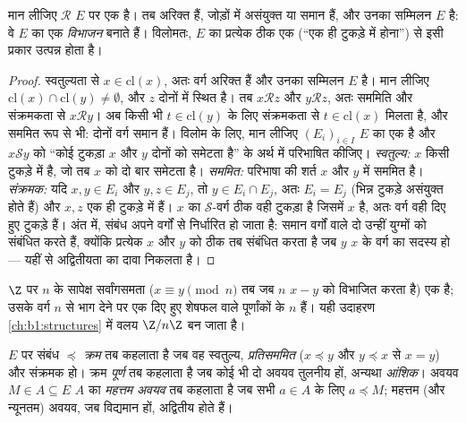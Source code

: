 \begin{theorem}[वर्ग विभाजन बनाते हैं]\label{thm:b1:logic:partition}
मान लीजिए $\mathcal{R}$ $E$ पर एक  है। तब  अरिक्त
हैं, जोड़ों में असंयुक्त या समान हैं, और उनका सम्मिलन $E$ है: वे $E$ का एक
\emph{विभाजन} बनाते हैं। विलोमतः, $E$ का प्रत्येक  ठीक
एक  (``एक ही टुकड़े में होना'') से इसी प्रकार उत्पन्न होता है।
\end{theorem}

\begin{proof}
स्वतुल्यता से $x \in \mathrm{cl}(x)$, अतः वर्ग अरिक्त हैं और उनका सम्मिलन
$E$ है। मान लीजिए $\mathrm{cl}(x) \cap \mathrm{cl}(y) \neq \emptyset$, और
$z$ दोनों में स्थित है। तब $x \mathbin{\mathcal{R}} z$ और $y
\mathbin{\mathcal{R}} z$, अतः सममिति और संक्रमकता से $x
\mathbin{\mathcal{R}} y$। अब किसी भी $t \in \mathrm{cl}(y)$ के लिए संक्रमकता
से $t \in \mathrm{cl}(x)$ मिलता है, और सममित रूप से भी: दोनों वर्ग समान हैं।
विलोम के लिए, मान लीजिए $(E_i)_{i \in I}$ $E$ का एक  है और $x
\mathbin{\mathcal S} y$ को ``कोई टुकड़ा $x$ और $y$ दोनों को समेटता है'' के
अर्थ में परिभाषित कीजिए। \emph{स्वतुल्य:} $x$ किसी टुकड़े में है, जो तब $x$
को दो बार समेटता है। \emph{सममित:} परिभाषा की शर्त $x$ और $y$ में सममित है।
\emph{संक्रमक:} यदि $x, y \in E_i$ और $y, z \in E_j$, तो $y \in E_i \cap
E_j$, अतः $E_i = E_j$ (भिन्न टुकड़े असंयुक्त होते हैं) और $x, z$ एक ही
टुकड़े में हैं। $x$ का $\mathcal S$-वर्ग ठीक वही टुकड़ा है जिसमें $x$ है,
अतः वर्ग वही दिए हुए टुकड़े हैं। अंत में, संबंध अपने वर्गों से निर्धारित हो
जाता है: समान वर्गों वाले दो  उन्हीं युग्मों को संबंधित करते
हैं, क्योंकि प्रत्येक $x$ और $y$ को ठीक तब संबंधित करता है जब $y$ $x$ के
वर्ग का सदस्य हो --- यहीं से अद्वितीयता का दावा निकलता है।
\end{proof}

\begin{example}\label{ex:b1:logic:congruence}
$\Z$ पर $n$ के सापेक्ष सर्वांगसमता ($x \equiv y \pmod n$ तब जब $n$ $x - y$
को विभाजित करता है) एक  है; उसके वर्ग $n$ से भाग देने पर एक दिए
हुए शेषफल वाले पूर्णांकों के $n$  हैं। यही उदाहरण
\cref{ch:b1:structures} में वलय $\Z/n\Z$ बन जाता है।
\end{example}

\begin{definition}[क्रम संबंध]\label{def:b1:logic:order}
$E$ पर संबंध $\preceq$ \emph{क्रम} तब कहलाता है जब वह
स्वतुल्य, \emph{प्रतिसममित} ($x \preceq y$ और $y \preceq x$ से $x = y$) और
संक्रमक हो। क्रम \emph{पूर्ण} तब कहलाता है जब कोई भी दो अवयव तुलनीय हों,
अन्यथा \emph{आंशिक}। अवयव $M \in A \subseteq E$ $A$ का \emph{महत्तम अवयव} तब
कहलाता है जब सभी $a \in A$ के लिए $a \preceq M$; महत्तम (और न्यूनतम) अवयव,
जब विद्यमान हों, अद्वितीय होते हैं।
\end{definition}

